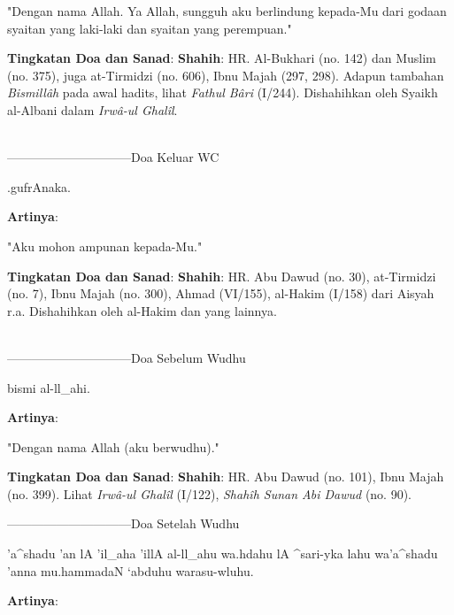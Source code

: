 \documentclass[a4paper,12pt]{article}
\begin{document}
\par
\indent
"Dengan nama Allah. Ya Allah, sungguh aku berlindung kepada-Mu dari godaan
syaitan yang laki-laki dan syaitan yang perempuan."\\
\par
\noindent
\textbf{Tingkatan Doa dan Sanad}: \textbf{Shahih}: HR. Al-Bukhari (no. 142)
dan Muslim (no. 375), juga at-Tirmidzi (no. 606), Ibnu Majah (297, 298).
Adapun tambahan \textit{Bismill\^{a}h} pada awal hadits, lihat
\textit{Fathul B\^{a}ri} (I/244). Dishahihkan oleh Syaikh al-Albani dalam
\textit{Irw\^{a}-ul Ghal\^{i}l}. \\\\
\par
{}------------------------------Doa Keluar WC
\begin{arabtext}
\noindent
.gufrAnaka.\\
\end{arabtext}
\noindent
\textbf{Artinya}:
\par
\indent
"Aku mohon ampunan kepada-Mu."\\
\par
\noindent
\textbf{Tingkatan Doa dan Sanad}: \textbf{Shahih}: HR. Abu Dawud (no. 30),
at-Tirmidzi (no. 7), Ibnu Majah (no. 300), Ahmad (VI/155), al-Hakim (I/158)
dari Aisyah r.a. Dishahihkan oleh al-Hakim dan yang lainnya.\\\\
\par
{}------------------------------Doa Sebelum Wudhu
\begin{arabtext}
\noindent
bismi al-ll_ahi.\\
\end{arabtext}
\noindent
\textbf{Artinya}:
\par
\indent
"Dengan nama Allah (aku berwudhu)."\\
\par
\noindent
\textbf{Tingkatan Doa dan Sanad}: \textbf{Shahih}: HR. Abu Dawud (no. 101),
Ibnu Majah (no. 399). Lihat \textit{Irw\^{a}-ul Ghal\^{i}l} (I/122), 
\textit{Shah\^{i}h Sunan Abi Dawud} (no. 90). \\
\par
{}------------------------------Doa Setelah Wudhu
\begin{arabtext}
\noindent
'a^shadu 'an lA 'il_aha 'illA al-ll_ahu wa.hdahu lA ^sari-yka lahu 
wa'a^shadu 'anna mu.hammadaN `abduhu warasu-wluhu.\\
\end{arabtext}
\noindent
\textbf{Artinya}:
\end{document}
